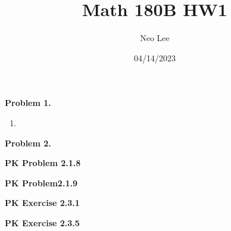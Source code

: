 \documentclass{article}
\title{Math 180B HW1}
\author{Neo Lee}
\date{04/14/2023}
\begin{document}
 

\maketitle 

\textbf{Problem 1.} 
\begin{enumerate}[label=(\alph*)]
    \item 
    
\end{enumerate}
\bigbreak

\textbf{Problem 2.} 
\bigbreak

\textbf{PK Problem 2.1.8} 
\bigbreak

\textbf{PK Problem2.1.9} 
\bigbreak

\textbf{PK Exercise 2.3.1} 
\bigbreak

\textbf{PK Exercise 2.3.5} 
\bigbreak
\end{document}
